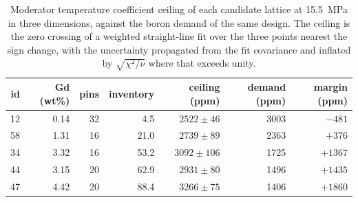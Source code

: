 \begin{table}[htbp]
  \centering
  \caption[Boron ceiling of each candidate lattice]{Moderator temperature coefficient ceiling of each candidate lattice at \SI{15.5}{MPa} in three dimensions, against the boron demand of the same design. The ceiling is the zero crossing of a weighted straight-line fit over the three points nearest the sign change, with the uncertainty propagated from the fit covariance and inflated by $\sqrt{\chi^2/\nu}$ where that exceeds unity.}
  \label{tab:c9-ceilings-p155}
  \begin{tabular}{rrrrrrr}
    \toprule
    id & Gd (wt\%) & pins & inventory & ceiling (ppm) & demand (ppm) & margin (ppm) \\
    \midrule
    12 & 0.14 & 32 & 4.5 & $2522 \pm 46$ & 3003 & $-481$ \\
    58 & 1.31 & 16 & 21.0 & $2739 \pm 89$ & 2363 & $+376$ \\
    34 & 3.32 & 16 & 53.2 & $3092 \pm 106$ & 1725 & $+1367$ \\
    44 & 3.15 & 20 & 62.9 & $2931 \pm 80$ & 1496 & $+1435$ \\
    47 & 4.42 & 20 & 88.4 & $3266 \pm 75$ & 1406 & $+1860$ \\
    \bottomrule
  \end{tabular}
\end{table}
